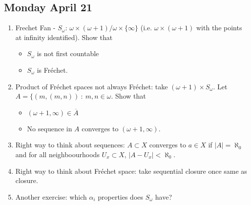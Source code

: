 \documentclass{article}
\begin{document}
\subsection*{Monday April 21} 
\begin{enumerate}
    \item Frechet Fan - \(S_{\omega}\): \(\omega \times (\omega + 1) / \omega \times \{\infty\}\) (i.e. \(\omega \times ( \omega + 1)\) with the points at infinity identified). Show that 
    \begin{itemize}
        \item \(S_{\omega}\) is not first countable \checkmark
        \item \(S_{\omega}\) is Fréchet. \checkmark
    \end{itemize}

    \item Product of Fréchet spaces not always Fréchet: take \((\omega + 1) \times S_{\omega}\). Let \(A = \{(m, (m, n)) \: : \: m,n \in \omega\). Show that 
    \begin{itemize}
        \item \((\omega + 1, \infty) \in \overline{A}\) \checkmark
        \item No sequence in \(A\) converges to \((\omega + 1, \infty)\). \checkmark
    \end{itemize}

    \item Right way to think about sequences: \(A \subset X\) converges to \(a \in X\) if \(|A| = \aleph_0\) and for all neighboourhoods \(U_x \subset X\), \(|A - U_x| < \aleph_0\).
    
    \item Right way to think about Fréchet space: take sequential closure once same as closure.
    \item Another exercise: which \(\alpha_i\) properties does \(S_{\omega}\) have? \checkmark
\end{enumerate}
\end{document}
